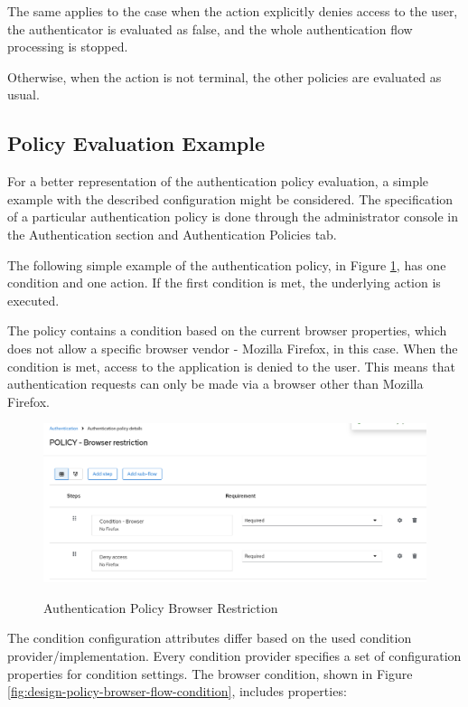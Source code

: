 The same applies to the case when the action explicitly denies access to the user, the authenticator is evaluated as false, and the whole authentication flow processing is stopped.

Otherwise, when the action is not terminal, the other policies are evaluated as usual.

\newpage

\subsection{Policy Evaluation Example}
For a better representation of the authentication policy evaluation, a simple example with the described configuration might be considered.
The specification of a particular authentication policy is done through the administrator console in the Authentication section and Authentication Policies tab.

The following simple example of the authentication policy, in Figure \ref{fig:design-policy-browser-flow}, has one condition and one action.
If the first condition is met, the underlying action is executed.

The policy contains a condition based on the current browser properties, which does not allow a specific browser vendor - Mozilla Firefox, in this case.
When the condition is met, access to the application is denied to the user.
This means that authentication requests can only be made via a browser other than Mozilla Firefox.

\begin{figure}[htbp]
  \centering
  \includegraphics[width=1\textwidth]{img/sections/5-design/policy-browser-flow.png}
  \label{fig:design-policy-browser-flow}
  \caption{Authentication Policy Browser Restriction}
\end{figure}

\newpage

The condition configuration attributes differ based on the used condition provider/implementation.
Every condition provider specifies a set of configuration properties for condition settings.
\newline
\newline
The browser condition, shown in Figure \ref{fig:design-policy-browser-flow-condition}, includes properties:

